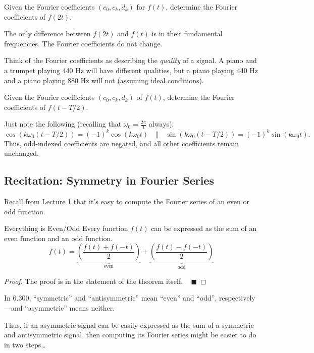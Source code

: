 \begin{problem}
    Given the Fourier coefficients $(c_0, c_k, d_k)$ for $f(t)$, determine the Fourier coefficients of $f(2t)$.
\end{problem}

\begin{solution}
    The only difference between $f(2t)$ and $f(t)$ is in their fundamental frequencies.
    The Fourier coefficients do not change.
\end{solution}

\begin{remark}
    Think of the Fourier coefficients as describing the \emph{quality} of a signal.
    A piano and a trumpet playing 440 Hz will have different qualities,
    but a piano playing 440 Hz and a piano playing 880 Hz will not
    (assuming ideal conditions).
\end{remark}

\begin{problem}
    Given the Fourier coefficients $(c_0, c_k, d_k)$ of $f(t)$, determine the Fourier coefficients of $f(t - T/2)$.
\end{problem}

\begin{solution}
    Just note the following (recalling that $\omega_0 = \frac{2\pi}{T}$ always):
    \[
    \cos\left(k \omega_0 \left(t - T/2\right)\right) = (-1)^k \cos(k \omega_0 t) ~~~ \parallel ~~~
    \sin\left(k \omega_0 \left(t - T/2\right)\right) = (-1)^k \sin(k \omega_0 t).
    \]
    Thus, odd-indexed coefficients are negated, and all other coefficients remain unchanged.
\end{solution}

\subsection{Recitation: Symmetry in Fourier Series}

Recall from \href{/6.300/lectures/1/#recitation-computing-fourier-series}{Lecture 1}
that it's easy to compute the Fourier series of an even or odd function.

\begin{theorem}{Everything is Even/Odd}
    Every function $f(t)$ can be expressed as the sum of an even function
    and an odd function.
    \[ f(t) =
    \underbrace{\left(\dfrac{f(t) + f(-t)}{2}\right)}_{\text{even}} +
    \underbrace{\left(\dfrac{f(t) - f(-t)}{2}\right)}_{\text{odd}} \]
\end{theorem}

\begin{proof}
    The proof is in the statement of the theorem itself. ~ $\blacksquare$
\end{proof}

In 6.300, ``symmetric'' and ``antisymmetric'' mean ``even'' and ``odd'', respectively---and
``asymmetric'' means neither.

Thus, if an asymmetric signal can be easily expressed as the sum of a symmetric and
antisymmetric signal, then computing its Fourier series might be easier to do in two steps\dots

